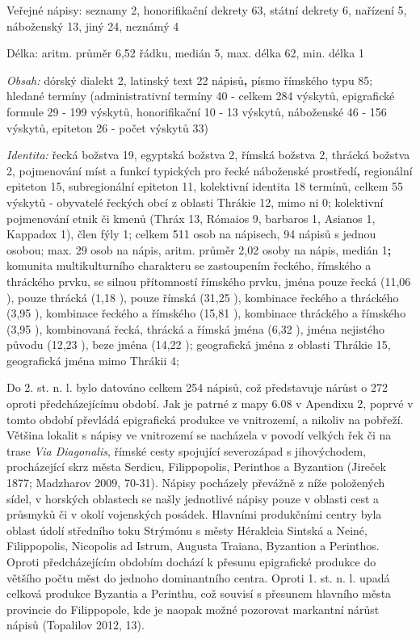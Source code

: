Veřejné nápisy: seznamy 2, honorifikační dekrety 63, státní dekrety 6, nařízení 5, náboženský 13, jiný 24, neznámý 4

Délka: aritm. průměr 6,52 řádku, medián 5, max. délka 62, min. délka 1

{\em Obsah:} dórský dialekt 2, latinský text 22 nápisů{\bf ,} písmo římského typu 85; hledané termíny (administrativní termíny 40 - celkem 284 výskytů, epigrafické formule 29 - 199 výskytů, honorifikační 10 - 13 výskytů, náboženské 46 - 156 výskytů, epiteton 26 - počet výskytů 33)

{\em Identita:} řecká božstva 19, egyptská božstva 2, římská božstva 2, thrácká božstva 2, pojmenování míst a funkcí typických pro řecké náboženské prostředí{\bf ,} regionální epiteton 15, subregionální epiteton 11, kolektivní identita 18 termínů, celkem 55 výskytů - obyvatelé řeckých obcí z oblasti Thrákie 12, mimo ni 0; kolektivní pojmenování etnik či kmenů (Thráx 13, Rómaios 9, barbaros 1, Asianos 1, Kappadox 1), člen fýly 1; celkem 511 osob na nápisech, 94 nápisů s jednou osobou; max. 29 osob na nápis, aritm. průměr 2,02 osoby na nápis, medián 1{\bf ;} komunita multikulturního charakteru se zastoupením řeckého, římského a thráckého prvku, se silnou přítomností římského prvku, jména pouze řecká (11,06 ), pouze thrácká (1,18 ), pouze římská (31,25 ), kombinace řeckého a thráckého (3,95 ), kombinace řeckého a římského (15,81 ), kombinace thráckého a římského (3,95 ), kombinovaná řecká, thrácká a římská jména (6,32 ), jména nejistého původu (12,23 ), beze jména (14,22 ); geografická jména z oblasti Thrákie 15, geografická jména mimo Thrákii 4;

\NC\AR
\HL
\HL
\stoptable

Do 2. st. n. l. bylo datováno celkem 254 nápisů, což představuje nárůst o 272  oproti předcházejícímu období. Jak je patrné z mapy 6.08 v Apendixu 2, poprvé v tomto období převládá epigrafická produkce ve vnitrozemí, a nikoliv na pobřeží. Většina lokalit s nápisy ve vnitrozemí se nacházela v povodí velkých řek či na trase {\em Via Diagonalis}, římské cesty spojující severozápad s jihovýchodem, procházející skrz města Serdicu, Filippopolis, Perinthos a Byzantion (Jireček 1877; Madzharov 2009, 70-31). Nápisy pocházely převážně z níže položených sídel, v horských oblastech se našly jednotlivé nápisy pouze v oblasti cest a průsmyků či v okolí vojenských posádek. Hlavními produkčními centry byla oblast údolí středního toku Strýmónu s městy Hérakleia Sintská a Neiné, Filippopolis, Nicopolis ad Istrum, Augusta Traiana, Byzantion a Perinthos. Oproti předcházejícím obdobím dochází k přesunu epigrafické produkce do většího počtu měst do jednoho dominantního centra. Oproti 1. st. n. l. upadá celková produkce Byzantia a Perinthu, což souvisí s přesunem hlavního města provincie do Filippopole, kde je naopak možné pozorovat markantní nárůst nápisů (Topalilov 2012, 13).

